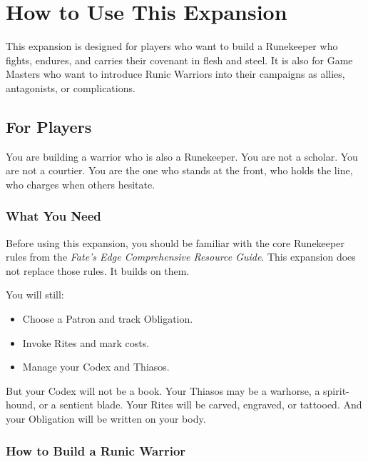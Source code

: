 \section{How to Use This Expansion}

This expansion is designed for players who want to build a Runekeeper who fights, endures, and carries their covenant in flesh and steel. It is also for Game Masters who want to introduce Runic Warriors into their campaigns as allies, antagonists, or complications.

\subsection{For Players}

You are building a warrior who is also a Runekeeper. You are not a scholar. You are not a courtier. You are the one who stands at the front, who holds the line, who charges when others hesitate.

\subsubsection{What You Need}

Before using this expansion, you should be familiar with the core Runekeeper rules from the \textit{Fate's Edge Comprehensive Resource Guide}. This expansion does not replace those rules. It builds on them.

You will still:
\begin{itemize}
\item Choose a Patron and track Obligation.
\item Invoke Rites and mark costs.
\item Manage your Codex and Thiasos.
\end{itemize}

But your Codex will not be a book. Your Thiasos may be a warhorse, a spirit-hound, or a sentient blade. Your Rites will be carved, engraved, or tattooed. And your Obligation will be written on your body.

\subsubsection{How to Build a Runic Warrior}

